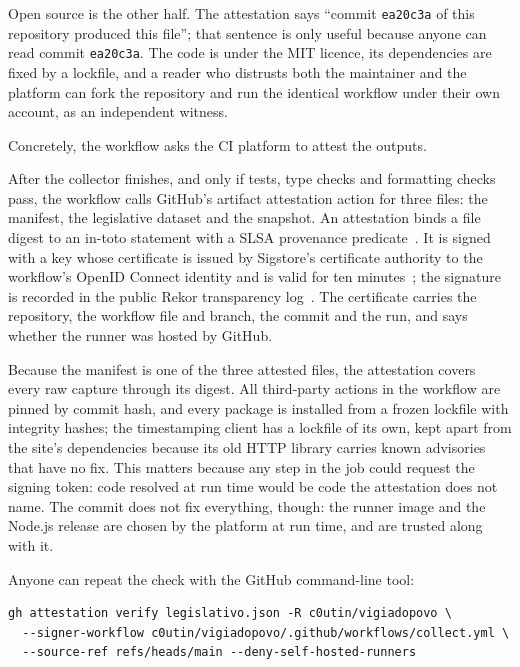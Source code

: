 Open source is the other half. The attestation says ``commit \texttt{ea20c3a} of this repository produced this file''; that sentence is only useful because anyone can read commit \texttt{ea20c3a}. The code is under the MIT licence, its dependencies are fixed by a lockfile, and a reader who distrusts both the maintainer and the platform can fork the repository and run the identical workflow under their own account, as an independent witness.

Concretely, the workflow asks the CI platform to attest the outputs.

After the collector finishes, and only if tests, type checks and formatting checks pass, the workflow calls GitHub's artifact attestation action for three files: the manifest, the legislative dataset and the snapshot. An attestation binds a file digest to an in-toto statement with a SLSA provenance predicate~\citep{torresarias2019intoto,slsa12provenance}. It is signed with a key whose certificate is issued by Sigstore's certificate authority to the workflow's OpenID Connect identity and is valid for ten minutes~\citep{newman2022sigstore,fulcio}; the signature is recorded in the public Rekor transparency log~\citep{github-attestations}. The certificate carries the repository, the workflow file and branch, the commit and the run, and says whether the runner was hosted by GitHub.

Because the manifest is one of the three attested files, the attestation covers every raw capture through its digest. All third-party actions in the workflow are pinned by commit hash, and every package is installed from a frozen lockfile with integrity hashes; the timestamping client has a lockfile of its own, kept apart from the site's dependencies because its old HTTP library carries known advisories that have no fix. This matters because any step in the job could request the signing token: code resolved at run time would be code the attestation does not name. The commit does not fix everything, though: the runner image and the Node.js release are chosen by the platform at run time, and are trusted along with it.

Anyone can repeat the check with the GitHub command-line tool:

\begin{lstlisting}
gh attestation verify legislativo.json -R c0utin/vigiadopovo \
  --signer-workflow c0utin/vigiadopovo/.github/workflows/collect.yml \
  --source-ref refs/heads/main --deny-self-hosted-runners
\end{lstlisting}

